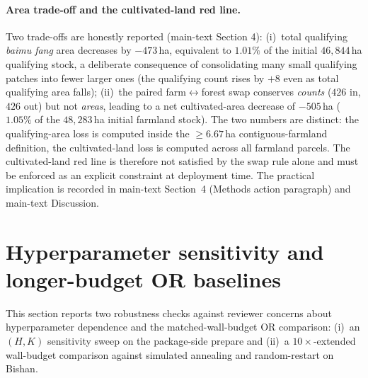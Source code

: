 \documentclass[11pt]{article}
\begin{document}
\paragraph{Area trade-off and the cultivated-land red line.} Two trade-offs are honestly reported (main-text Section 4): (i)~total qualifying \textit{baimu fang} area decreases by $-473$\,ha, equivalent to $1.01\%$ of the initial $46{,}844$\,ha qualifying stock, a deliberate consequence of consolidating many small qualifying patches into fewer larger ones (the qualifying count rises by $+8$ even as total qualifying area falls); (ii)~the paired farm$\leftrightarrow$forest swap conserves \emph{counts} ($426$ in, $426$ out) but not \emph{areas}, leading to a net cultivated-area decrease of $-505$\,ha ($1.05\%$ of the $48{,}283$\,ha initial farmland stock). The two numbers are distinct: the qualifying-area loss is computed inside the $\geq 6.67$\,ha contiguous-farmland definition, the cultivated-land loss is computed across all farmland parcels. The cultivated-land red line is therefore not satisfied by the swap rule alone and must be enforced as an explicit constraint at deployment time. The practical implication is recorded in main-text Section~4 (Methods action paragraph) and main-text Discussion.

\section{Hyperparameter sensitivity and longer-budget OR baselines}\label{si:hyperparameter-sensitivity}

This section reports two robustness checks against reviewer concerns about hyperparameter dependence and the matched-wall-budget OR comparison: (i)~an $(H, K)$ sensitivity sweep on the package-side prepare and (ii)~a $10\times$-extended wall-budget comparison against simulated annealing and random-restart on Bishan.
\end{document}
